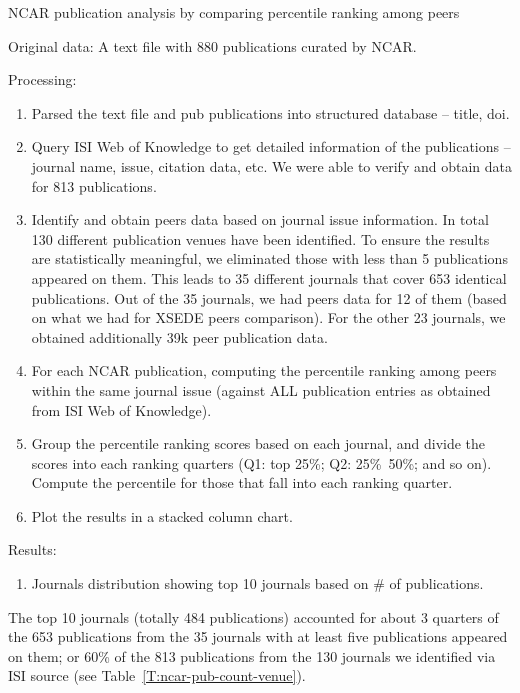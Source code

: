 \documentclass{sig-alternate}
\begin{document}
NCAR publication analysis by comparing percentile ranking among peers


Original data:
A text file with 880 publications curated by NCAR.

Processing:

\begin{enumerate}

\item Parsed the text file and pub publications into structured
  database -- title, doi.

\item Query ISI Web of Knowledge to get detailed information of the
  publications -- journal name, issue, citation data, etc. We were
  able to verify and obtain data for 813 publications.

\item Identify and obtain peers data based on journal issue
  information. In total 130 different publication venues have been
  identified. To ensure the results are statistically meaningful, we
  eliminated those with less than 5 publications appeared on them.
  This leads to 35 different journals that cover 653 identical
  publications. Out of the 35 journals, we had peers data for 12 of
  them (based on what we had for XSEDE peers comparison). For the
  other 23 journals, we obtained additionally 39k peer publication
  data.

\item For each NCAR publication, computing the percentile ranking
  among peers within the same journal issue (against ALL publication
  entries as obtained from ISI Web of Knowledge).

\item Group the percentile ranking scores based on each journal, and
  divide the scores into each ranking quarters (Q1: top 25\%; Q2:
  25\%~50\%; and so on). Compute the percentile for those that fall
  into each ranking quarter.

\item Plot the results in a stacked column chart.

\end{enumerate}

Results:
\begin{enumerate}
\item	Journals distribution showing top 10 journals based on \# of publications.
\end{enumerate}

The top 10 journals (totally 484 publications) accounted for about 3
quarters of the 653 publications from the 35 journals with at least
five publications appeared on them; or 60\% of the 813 publications
from the 130 journals we identified via ISI source (see
Table~\ref{T:ncar-pub-count-venue}).
\end{document}
